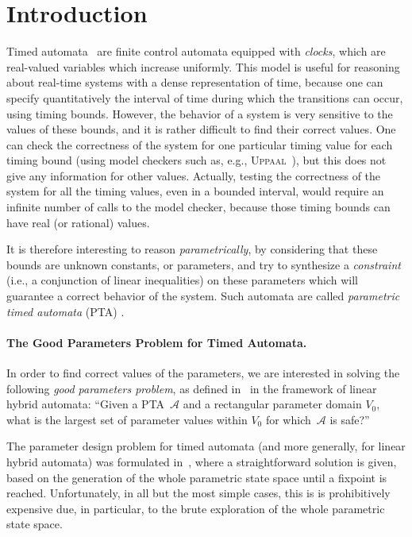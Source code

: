 \documentclass[a4paper,10pt]{article}
\newcommand{\A}{\mathcal{A}}
\newcommand{\uppaal}{\textsc{Uppaal}}
\newcommand{\paragraphe}[1]{\paragraph{#1.}}
\begin{document}
\section{Introduction}

Timed automata~\cite{ad94} are finite control automata equipped with {\em clocks}, which are real-valued variables which increase uniformly.
This model is useful for reasoning about real-time systems with a dense representation of time, because one can specify quantitatively the interval of time during which the transitions can occur, using timing bounds.
However, the behavior of a system is very sensitive to the values of these bounds, and it is rather difficult to find their correct values.
One can check the correctness of the system for one particular timing value for each timing bound (using model checkers such as, e.g., \uppaal{}~\cite{lpy97}), but this does not give any information for other values.
Actually, testing the correctness of the system for all the timing values, even in a bounded interval, would require an infinite number of calls to the model checker, because those timing bounds can have real (or rational) values.

It is therefore interesting to reason \emph{parametrically}, by considering that these bounds are unknown constants, or parameters, and try to synthesize a {\em constraint} (i.e., a conjunction of linear inequalities) on these parameters which will guarantee a correct behavior of the system.
Such automata are called \emph{parametric timed automata} (PTA) \cite{ahv93}. %

\paragraphe{The Good Parameters Problem for Timed Automata}
In order to find correct values of the parameters, we are interested in solving the following \emph{good parameters problem}, as defined in~\cite{fjk08} in the framework of linear hybrid automata:
``Given a PTA~$\A$ and a rectangular parameter domain $V_0$, what is the largest set of parameter values within $V_0$ for which~$\A$ is safe?''

The parameter design problem for timed automata (and more generally, for linear hybrid automata)
was formulated %
in~\cite{hw96}, where a straightforward solution is given,
based on the generation of the whole parametric state space until a fixpoint is reached.
Unfortunately, in all but the most simple cases, this is is prohibitively expensive due, in particular, to the brute exploration of the whole parametric state space.
\end{document}

